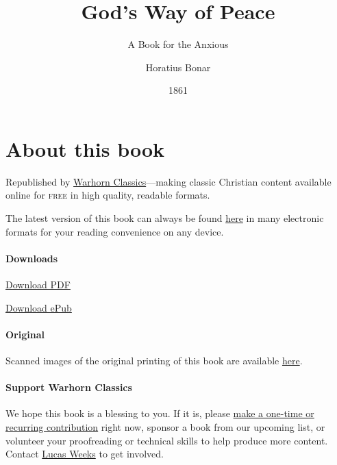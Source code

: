 \documentclass[
]{book}
\title{God's Way of Peace}
\subtitle{A Book for the Anxious}
\author{Horatius Bonar}
\date{1861}
\begin{document}
\maketitle

\mainmatter
{}

{
\setcounter{tocdepth}{1}
\tableofcontents
}
\hypertarget{about-this-book}{%
\chapter*{About this book}\label{about-this-book}}

Republished by \href{https://classics.warhornmedia.com/}{Warhorn Classics}---making classic Christian content available online for \textsc{free} in high quality, readable formats.

The latest version of this book can always be found \href{https://warhornmedia.github.io/bonar-peace/}{here} in many electronic formats for your reading convenience on any device.

\hypertarget{downloads}{%
\subsubsection*{Downloads}\label{downloads}}

\href{https://warhornmedia.github.io/bonar-peace//Bonar-Peace.pdf}{Download PDF}

\href{https://warhornmedia.github.io/bonar-peace//Bonar-Peace.epub}{Download ePub}

\hypertarget{original}{%
\subsubsection*{Original}\label{original}}

Scanned images of the original printing of this book are available \href{https://archive.org/details/godswayofpeacebo00bona/page/n5/mode/2up}{here}.

\hypertarget{support-warhorn-classics}{%
\subsubsection*{Support Warhorn Classics}\label{support-warhorn-classics}}

We hope this book is a blessing to you. If it is, please \href{https://warhornmedia.com/give}{make a one-time or recurring contribution} right now, sponsor a book from our upcoming list, or volunteer your proofreading or technical skills to help produce more content. Contact \href{mailto:lucas@beggarsborn.com}{Lucas Weeks} to get involved.
\end{document}
